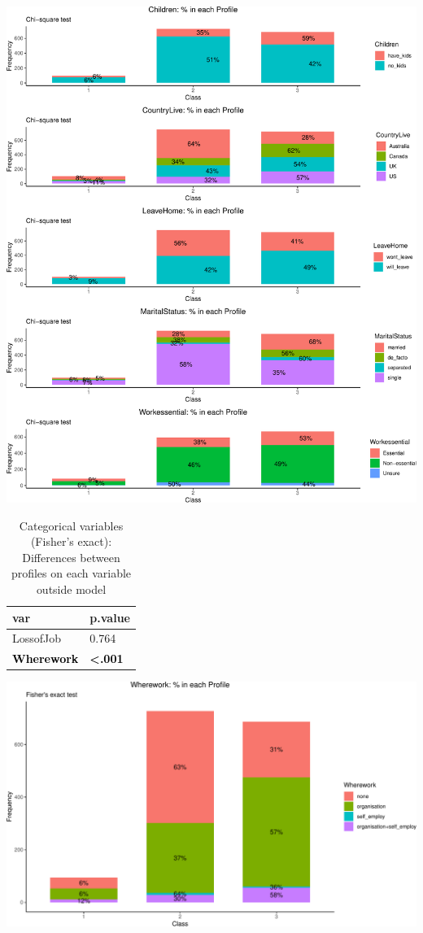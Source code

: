 \documentclass[]{article}
\begin{document}
\begin{center}\includegraphics{lpa_analyses_files/figure-latex/unnamed-chunk-19-1} \end{center}

\newpage
\begin{table}[H]

\caption{\label{tab:unnamed-chunk-20}Categorical variables (Fisher's exact): Differences between profiles on each variable outside model}
\centering
\fontsize{6}{8}\selectfont
\begin{tabular}[t]{ll}
\toprule
var & p.value\\
\midrule
LossofJob & 0.764\\
\textcolor{black}{\textbf{Wherework}} & \textcolor{black}{\textbf{<.001}}\\
\bottomrule
\end{tabular}
\end{table}

\begin{center}\includegraphics{lpa_analyses_files/figure-latex/unnamed-chunk-20-1} \end{center}
\end{document}
